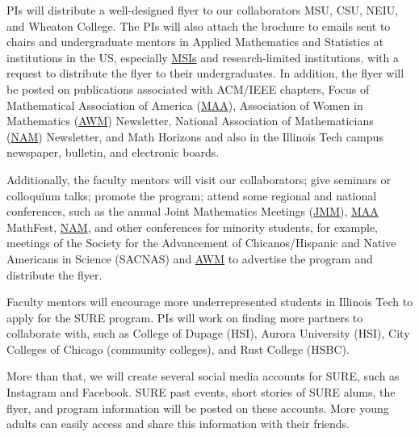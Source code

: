 \documentclass[11pt]{NSFamsart}
\newcommand{\MAA}{\hyperlink{MAAlink}{MAA}\xspace}
\newcommand{\JMM}{\hyperlink{JMMlink}{JMM}\xspace}
\newcommand{\AWM}{\hyperlink{AWMlink}{AWM}\xspace}
\newcommand{\NAM}{\hyperlink{NAMlink}{NAM}\xspace}
\newcommand{\MSIs}{\hyperlink{MSIlink}{MSIs}\xspace}
\begin{document}
PIs will distribute a well-designed flyer to our collaborators MSU, CSU, NEIU,  and Wheaton College.
The PIs will also attach the brochure to emails sent to
chairs and undergraduate mentors in Applied Mathematics and Statistics at institutions in the US, especially
\MSIs and research-limited institutions, with a request to distribute the flyer to their undergraduates. 
In addition, the flyer
will be posted on publications associated with ACM/IEEE chapters, Focus of \hypertarget{MAAlink}{Mathematical Association of America} (\MAA), \hypertarget{AWMlink}{Association of Women in Mathematics} (\AWM)
Newsletter, \hypertarget{NAMlink}{ National Association of Mathematicians} (\NAM) Newsletter, and Math Horizons and also in the Illinois Tech campus newspaper, bulletin, and electronic boards.

Additionally, the faculty mentors will visit our collaborators; give seminars or colloquium talks; promote the program;  
attend some regional and national conferences, such as
the annual  \hypertarget{JMMlink}{Joint Mathematics Meetings} (\JMM), \MAA MathFest, \NAM, and other conferences for minority students, for example, meetings of the Society for the Advancement of Chicanos/Hispanic and Native Americans in Science  (SACNAS) and 
\AWM  to advertise the program and distribute the flyer. 

Faculty mentors will encourage more underrepresented students in Illinois Tech to apply for the SURE program. PIs will work on finding more partners to collaborate with, such as College of Dupage (HSI), Aurora University (HSI), City Colleges of Chicago (community colleges), and Rust College (HSBC).

More than that, we will create several social media accounts for SURE, such as Instagram and Facebook. SURE past events, short stories of SURE alums, the flyer, and program information will be posted on these accounts. More young adults can easily access and share this information with their friends.

\end{document}

